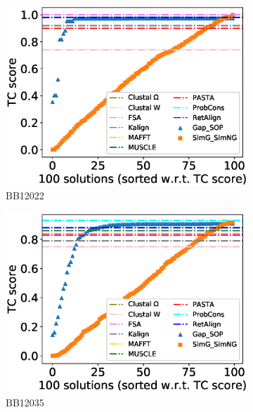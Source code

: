 \begin{figure}[!htbp]
\begin{adjustwidth}{-1.5cm}{-1cm}
\begin{subfigure}{0.22\textwidth}
			\includegraphics[width=\columnwidth]{Figure/summary/precomputedInit/Balibase/BB12022_tc_density_single_run_2}
			\caption{BB12022}
		\end{subfigure}
		\begin{subfigure}{0.22\textwidth}
			\includegraphics[width=\columnwidth]{Figure/summary/precomputedInit/Balibase/BB12035_tc_density_single_run_2}
			\caption{BB12035}
		\end{subfigure}
		\begin{subfigure}{0.22\textwidth}

\end{subfigure}
\end{adjustwidth}
\end{figure}
